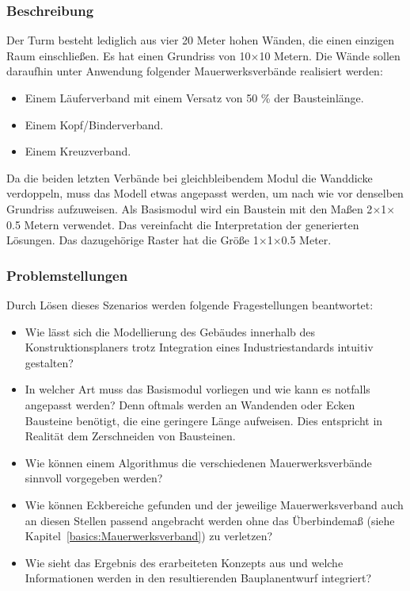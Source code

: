 \subsubsection*{Beschreibung}
Der Turm besteht lediglich aus vier 20 Meter hohen Wänden, die einen einzigen Raum einschließen.
Es hat einen Grundriss von 10$\times$10 Metern.
Die Wände sollen daraufhin unter Anwendung folgender Mauerwerksverbände realisiert werden:
\begin{itemize}
  \item Einem Läuferverband mit einem Versatz von 50 \% der Bausteinlänge.
  \item Einem Kopf/Binderverband.
  \item Einem Kreuzverband.
\end{itemize}
Da die beiden letzten Verbände bei gleichbleibendem Modul die Wanddicke verdoppeln, muss das Modell etwas angepasst werden, um nach wie vor denselben Grundriss aufzuweisen.
Als Basismodul wird ein Baustein mit den Maßen 2$\times$1$\times$0.5 Metern verwendet.
Das vereinfacht die Interpretation der generierten Lösungen.
Das dazugehörige Raster hat die Größe 1$\times$1$\times$0.5 Meter.

\subsubsection*{Problemstellungen}
Durch Lösen dieses Szenarios werden folgende Fragestellungen beantwortet:
\begin{itemize}
  \item Wie lässt sich die Modellierung des Gebäudes innerhalb des Konstruktionsplaners trotz Integration eines Industriestandards intuitiv gestalten?
  \item In welcher Art muss das Basismodul vorliegen und wie kann es notfalls angepasst werden? 
  Denn oftmals werden an Wandenden oder Ecken Bausteine benötigt, die eine geringere Länge aufweisen.
  Dies entspricht in Realität dem Zerschneiden von Bausteinen.
  \item Wie können einem Algorithmus die verschiedenen Mauerwerksverbände sinnvoll vorgegeben werden?
  \item Wie können Eckbereiche gefunden und der jeweilige Mauerwerksverband auch an diesen Stellen passend angebracht werden ohne das Überbindemaß (siehe Kapitel~\ref{basics:Mauerwerksverband}) zu verletzen?
  \item Wie sieht das Ergebnis des erarbeiteten Konzepts aus und welche Informationen werden in den resultierenden Bauplanentwurf integriert?
\end{itemize}

